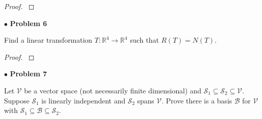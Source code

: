 \documentclass{article}
\begin{document}
\begin{proof}
$ $\newline
\end{proof}

\newpage
$ \bullet$ \textbf{Problem 6}
\medskip

\begin{itshape}
Find a linear transformation $T: \mathbb{R}^4 \to \mathbb{R}^4$ such that $R(T)=N(T)$.
\end{itshape}
\medskip

\begin{proof}
$ $\newline
\end{proof}

\newpage
$ \bullet$ \textbf{Problem 7}
\medskip

\begin{itshape}
Let $\mathcal{V}$ be a vector space (not necessarily finite dimensional) and $\mathcal{S}_1 \subseteq \mathcal{S}_2 \subseteq \mathcal{V}$. Suppose $\mathcal{S}_1$ is linearly independent and $\mathcal{S}_2$ spans $\mathcal{V}$. Prove there is a basis $\mathcal{B}$ for $\mathcal{V}$ with $\mathcal{S}_1 \subseteq \mathcal{B} \subseteq \mathcal{S}_2$.
\end{itshape}
\end{document}
